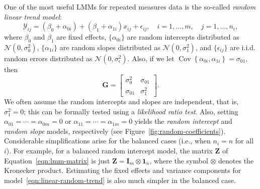 \documentclass[cmfont,usenames,dvipsnames,leqno]{afit-etd}\usepackage[]{graphicx}\usepackage[]{color}
\newcommand{\mc}[1]{\ensuremath{\mathcal{#1}}}
\newcommand{\cov}{\operatorname{Cov}}
\newcommand{\Z}{\ensuremath{\bm{Z}}}
\begin{document}
One of the most useful LMMs for repeated measures data is the so-called \textit{random linear trend model}:
\begin{equation}
\label{eqn:linear-random-trend}
  \mc{Y}_{ij} = \left(\beta_0 + \alpha_{0i}\right) + \left(\beta_1 + \alpha_{1i}\right)x_{ij} + \epsilon_{ij}, \quad i = 1, \dotsc, m, \quad j = 1, \dotsc, n_i,
\end{equation}
where $\beta_0$ and $\beta_1$ are fixed effects, $\big\{\alpha_{0i}\big\}$ are random intercepts distributed as $\mc{N}\left(0, \sigma_0^2\right)$, $\big\{\alpha_{1i}\big\}$ are random slopes distributed as $\mc{N}\left(0, \sigma_1^2\right)$, and $\big\{\epsilon_{ij}\big\}$ are i.i.d. random errors distributed as $\mc{N}\left(0, \sigma_\epsilon^2\right)$. Also, if we let $\cov\left\{\alpha_{0i}, \alpha_{1i}\right\} = \sigma_{01}$, then 
\begin{equation*}
  \bm{G} = 
    \begin{bmatrix}
      \sigma_0^2  & \sigma_{01} \\
      \sigma_{01} & \sigma_1^2
    \end{bmatrix}.
\end{equation*}
We often assume the random intercepts and slopes are independent, that is, $\sigma_1^2 = 0$; this can be formally tested using a \textit{likelihood ratio test}. Also, setting $\alpha_{01} = \dotsb = \alpha_{0m} = 0$ or $\alpha_{11} = \dotsb = \alpha_{1m} = 0$ yields the \textit{random intercept} and \textit{random slope} models, respectively (see Figure~\ref{fig:random-coefficients}). Considerable simplifications arise for the balanced cases (i.e., when $n_i = n$ for all $i$). For example, for a balanced random intercept model, the matrix $\Z$ of Equation~\eqref{eqn:lmm-matrix} is just $\Z = \bm{I}_m \otimes \bm{1}_n$, where the symbol $\otimes$ denotes the Kronecker product. Estimating the fixed effects and variance components for model~\eqref{eqn:linear-random-trend} is also much simpler in the balanced case. 
\end{document}
